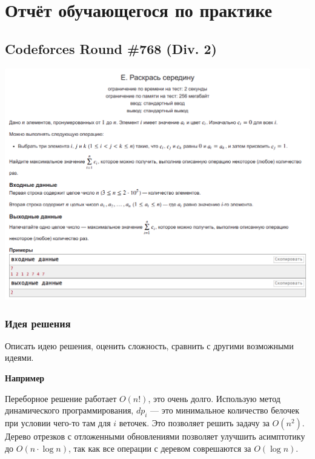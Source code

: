 %
%

\section{Отчёт обучающегося по практике}

\subsection*{Codeforces Round \#768 (Div. 2)}
\begin{center}
\includegraphics[width=\textwidth]{statements/sample-cf.png}
\end{center}
\subsubsection*{Идея решения}
Описать идею решения, оценить сложность, сравнить с другими возможными идеями.

{\bfseries \large Например}

Переборное решение работает $O(n!)$, это очень долго. Использую метод динамического программирования, $dp_i$ --- это минимальное количество белочек при условии чего-то там для $i$ веточек. Это позволяет решить задачу за $O(n ^ 2)$. Дерево отрезков с отложенными обновлениями позволяет улучшить асимптотику до $O(n \cdot \log{n})$, так как все операции с деревом соврешаются за $O(\log{n})$.

